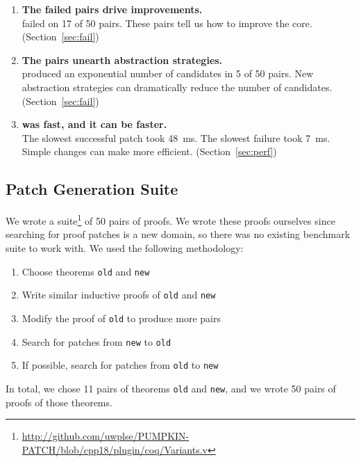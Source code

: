 \begin{enumerate}
\item \textbf{The failed pairs drive improvements.} \\
\sysname failed on 17 of 50 pairs. These pairs tell us how to improve the core. (Section~\ref{sec:fail})
\item \textbf{The pairs unearth abstraction strategies.} \\
\sysname produced an exponential number of candidates in 5 of 50 pairs.
New abstraction strategies can dramatically reduce the number of candidates. (Section~\ref{sec:fail})
\item \textbf{\sysname was fast, and it can be faster.} \\
The slowest successful patch took \SI{48}{\ms}. The slowest failure took \SI{7}{\ms}.
Simple changes can make \sysname more efficient. (Section~\ref{sec:perf})
\end{enumerate}

\subsection{Patch Generation Suite}
\label{sec:suite}

We wrote a suite\footnote{\url{http://github.com/uwplse/PUMPKIN-PATCH/blob/cpp18/plugin/coq/Variants.v}} of 50 pairs of proofs.
We wrote these proofs ourselves since searching for proof patches is a new domain,
so there was no existing benchmark suite to work with.
We used the following methodology:

\begin{enumerate}
\item Choose theorems \lstinline{old} and \lstinline{new}
\item Write similar inductive proofs of \lstinline{old} and \lstinline{new}
\item Modify the proof of \lstinline{old} to produce more pairs
\item Search for patches from \lstinline{new} to \lstinline{old}
\item If possible, search for patches from \lstinline{old} to \lstinline{new}
\end{enumerate}

In total, we chose 11 pairs of theorems \lstinline{old} and \lstinline{new}, and we wrote
50 pairs of proofs of those theorems.

